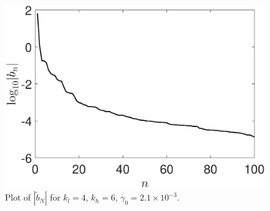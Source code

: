 \documentclass[a4paper,11pt]{article}
\begin{document}
\begin{figure}[!h]
\centering
\includegraphics[width=.7\textwidth]{dmd_mags_wwt_K_128_Lx_128_tf_1pt5e4}
\caption{Plot of $\left|\tilde{b}_{N}\right|$ for $k_{l}=4$, $k_{h}=6$, $\gamma_{0}=2.1\times 10^{-3}$.}
\label{fig:bmmagslfwwt}
\end{figure}
\end{document}
